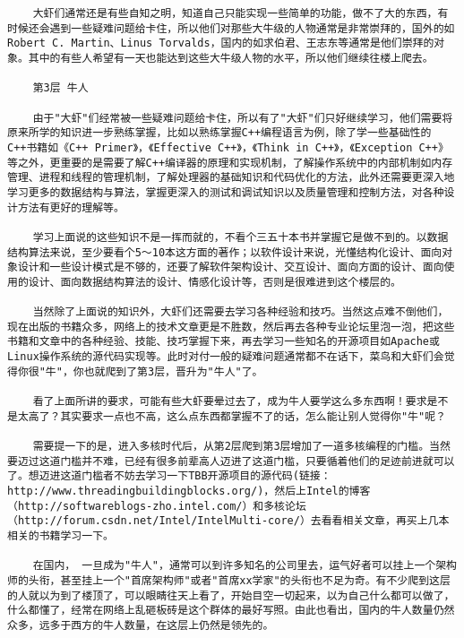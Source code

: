 \begin{verbatim}
    大虾们通常还是有些自知之明，知道自己只能实现一些简单的功能，做不了大的东西，有时候还会遇到一些疑难问题给卡住，所以他们对那些大牛级的人物通常是非常崇拜的，国外的如Robert C. Martin、Linus Torvalds，国内的如求伯君、王志东等通常是他们崇拜的对象。其中的有些人希望有一天也能达到这些大牛级人物的水平，所以他们继续往楼上爬去。

    第3层 牛人

    由于"大虾"们经常被一些疑难问题给卡住，所以有了"大虾"们只好继续学习，他们需要将原来所学的知识进一步熟练掌握，比如以熟练掌握C++编程语言为例，除了学一些基础性的C++书籍如《C++ Primer》，《Effective C++》，《Think in C++》，《Exception C++》等之外，更重要的是需要了解C++编译器的原理和实现机制，了解操作系统中的内部机制如内存管理、进程和线程的管理机制，了解处理器的基础知识和代码优化的方法，此外还需要更深入地学习更多的数据结构与算法，掌握更深入的测试和调试知识以及质量管理和控制方法，对各种设计方法有更好的理解等。

    学习上面说的这些知识不是一挥而就的，不看个三五十本书并掌握它是做不到的。以数据结构算法来说，至少要看个5～10本这方面的著作；以软件设计来说，光懂结构化设计、面向对象设计和一些设计模式是不够的，还要了解软件架构设计、交互设计、面向方面的设计、面向使用的设计、面向数据结构算法的设计、情感化设计等，否则是很难进到这个楼层的。

    当然除了上面说的知识外，大虾们还需要去学习各种经验和技巧。当然这点难不倒他们，现在出版的书籍众多，网络上的技术文章更是不胜数，然后再去各种专业论坛里泡一泡，把这些书籍和文章中的各种经验、技能、技巧掌握下来，再去学习一些知名的开源项目如Apache或Linux操作系统的源代码实现等。此时对付一般的疑难问题通常都不在话下，菜鸟和大虾们会觉得你很"牛"，你也就爬到了第3层，晋升为"牛人"了。

    看了上面所讲的要求，可能有些大虾要晕过去了，成为牛人要学这么多东西啊！要求是不是太高了？其实要求一点也不高，这么点东西都掌握不了的话，怎么能让别人觉得你"牛"呢？

    需要提一下的是，进入多核时代后，从第2层爬到第3层增加了一道多核编程的门槛。当然要迈过这道门槛并不难，已经有很多前辈高人迈进了这道门槛，只要循着他们的足迹前进就可以了。想迈进这道门槛者不妨去学习一下TBB开源项目的源代码(链接：http://www.threadingbuildingblocks.org/)，然后上Intel的博客（http://softwareblogs-zho.intel.com/）和多核论坛（http://forum.csdn.net/Intel/IntelMulti-core/）去看看相关文章，再买上几本相关的书籍学习一下。

    在国内， 一旦成为"牛人"，通常可以到许多知名的公司里去，运气好者可以挂上一个架构师的头衔，甚至挂上一个"首席架构师"或者"首席xx学家"的头衔也不足为奇。有不少爬到这层的人就以为到了楼顶了，可以眼睛往天上看了，开始目空一切起来，以为自己什么都可以做了，什么都懂了，经常在网络上乱砸板砖是这个群体的最好写照。由此也看出，国内的牛人数量仍然众多，远多于西方的牛人数量，在这层上仍然是领先的。


\end{verbatim}

